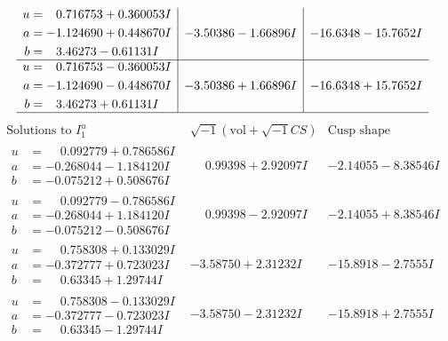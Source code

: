 \documentclass[1p]{elsarticle_modified}
\theoremstyle{definition}
\newcommand{\I}{\sqrt{-1}}
\begin{document}
$$\begin{array}{c|c|c}
\begin{aligned}
u &= \phantom{-}0.716753 + 0.360053 I \\
a &= -1.124690 + 0.448670 I \\
b &= \phantom{-}3.46273 - 0.61131 I\end{aligned}
 & -3.50386 - 1.66896 I & -16.6348 - 15.7652 I \\ \hline\begin{aligned}
u &= \phantom{-}0.716753 - 0.360053 I \\
a &= -1.124690 - 0.448670 I \\
b &= \phantom{-}3.46273 + 0.61131 I\end{aligned}
 & -3.50386 + 1.66896 I & -16.6348 + 15.7652 I\\
 \hline 
 \end{array}$$\newpage$$\begin{array}{c|c|c}  
\text{Solutions to }I^u_{1}& \I (\text{vol} + \sqrt{-1}CS) & \text{Cusp shape}\\
 \hline 
\begin{aligned}
u &= \phantom{-}0.092779 + 0.786586 I \\
a &= -0.268044 - 1.184120 I \\
b &= -0.075212 + 0.508676 I\end{aligned}
 & \phantom{-}0.99398 + 2.92097 I & -2.14055 - 8.38546 I \\ \hline\begin{aligned}
u &= \phantom{-}0.092779 - 0.786586 I \\
a &= -0.268044 + 1.184120 I \\
b &= -0.075212 - 0.508676 I\end{aligned}
 & \phantom{-}0.99398 - 2.92097 I & -2.14055 + 8.38546 I \\ \hline\begin{aligned}
u &= \phantom{-}0.758308 + 0.133029 I \\
a &= -0.372777 + 0.723023 I \\
b &= \phantom{-}0.63345 + 1.29744 I\end{aligned}
 & -3.58750 + 2.31232 I & -15.8918 - 2.7555 I \\ \hline\begin{aligned}
u &= \phantom{-}0.758308 - 0.133029 I \\
a &= -0.372777 - 0.723023 I \\
b &= \phantom{-}0.63345 - 1.29744 I\end{aligned}
 & -3.58750 - 2.31232 I & -15.8918 + 2.7555 I \\ \hline\begin{aligned}

\end{aligned}
\end{array}$$
\end{document}
